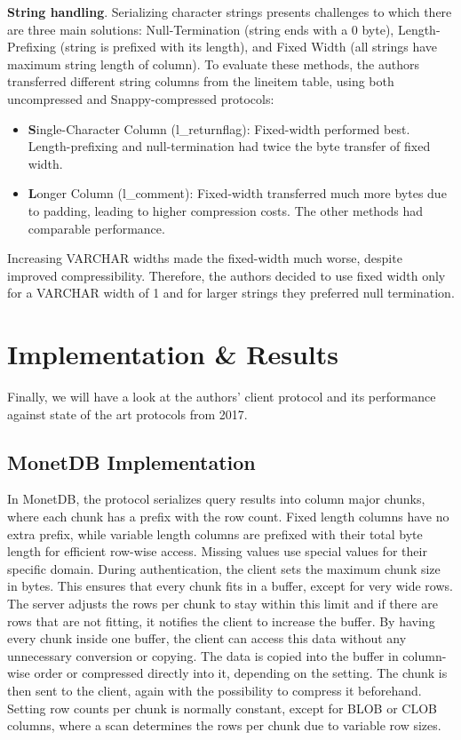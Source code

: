 \documentclass[sigconf]{acmart}
\begin{document}
\textbf{String handling}.
Serializing character strings presents challenges to which there are three main solutions: Null-Termination (string ends with a 0 byte), Length-Prefixing (string is prefixed with its length), and Fixed Width (all strings have maximum string length of column). To evaluate these methods, the authors transferred different string columns from the lineitem table, using both uncompressed and Snappy-compressed protocols:
\begin{itemize}
    \item \textbf Single-Character Column (l\_returnflag): Fixed-width performed best. Length-prefixing and null-termination had twice the byte transfer of fixed width.
    \item \textbf Longer Column (l\_comment): Fixed-width transferred much more bytes due to padding, leading to higher compression costs. The other methods had comparable performance.
\end{itemize}

Increasing VARCHAR widths made the fixed-width much worse, despite improved compressibility. Therefore, the authors decided to use fixed width only for a VARCHAR width of 1 and for larger strings they preferred null termination.


\section{Implementation \& Results}
Finally, we will have a look at the authors’ client protocol and its performance against state of the art protocols from 2017. 

\subsection{MonetDB Implementation}
In MonetDB, the protocol serializes query results into column major chunks, where each chunk has a prefix with the row count. Fixed length columns have no extra prefix, while variable length columns are prefixed with their total byte length for efficient row-wise access. Missing values use special values for their specific domain.
During authentication, the client sets the maximum chunk size in bytes. This ensures that every chunk fits in a buffer, except for very wide rows. The server adjusts the rows per chunk to stay within this limit and if there are rows that are not fitting, it notifies the client to increase the buffer. By having every chunk inside one buffer, the client can access this data without any unnecessary conversion or copying.
The data is copied into the buffer in column-wise order or compressed directly into it, depending on the setting. The chunk is then sent to the client, again with the possibility to compress it beforehand. Setting row counts per chunk is normally constant, except for BLOB or CLOB columns, where a scan determines the rows per chunk due to variable row sizes.
\end{document}
